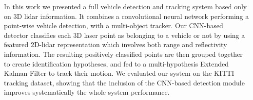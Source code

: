 \documentclass[letterpaper, 10 pt, conference]{ieeeconf}  %
\begin{document}
In this work we presented a full vehicle detection and tracking system based only on 3D lidar information. It combines a convolutional neural network performing a point-wise vehicle detection, with a multi-object tracker. 
Our CNN-based detector classifies each 3D laser point as belonging to a vehicle or not by using a featured 2D-lidar representation which involves both range and reflectivity information. The resulting positively classified points are then grouped together to create identification hypotheses, and fed to a multi-hypothesis Extended Kalman Filter to track their motion.
We evaluated our system on the KITTI tracking dataset, showing that the inclusion of the CNN-based detection module improves systematically the whole system performance.





\end{document}
